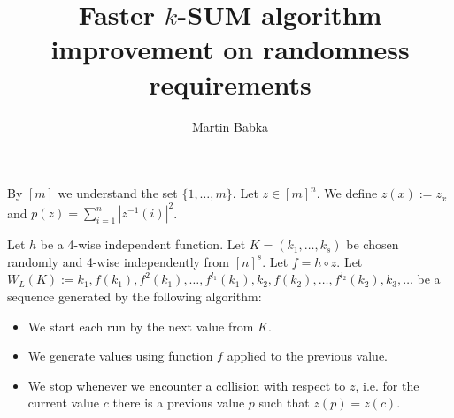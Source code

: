 \documentclass{article}
\title{Faster $k$-SUM algorithm improvement on randomness requirements}
\author{Martin Babka}
\begin{document}
\maketitle

By $[m]$ we understand the set $\{1, \dots, m\}$.
Let $z \in [m]^n$. 
We define $z(x) := z_x$ and $p(z) = \sum_{i = 1}^{n} |z^{-1}(i)|^2$.

Let $h$ be a 4-wise independent function. 
Let $K = (k_1, \dots, k_s)$ be chosen randomly and 4-wise independently from $[n]^s$.
Let $f = h \circ z$.
Let $W_L(K) := k_1, f(k_1), f^2(k_1), \dots, f^{l_1}(k_1), k_2, f(k_2), \dots, f^{l_2}(k_2), k_3, \dots$ be a sequence generated by the following algorithm:
\begin{itemize}
    \item We start each run by the next value from $K$.
    \item We generate values using function $f$ applied to the previous value.
    \item We stop whenever we encounter a collision with respect to $z$, i.e. for the current value $c$ there is a previous value $p$ such that $z(p) = z(c)$.
\end{itemize}
\end{document}
